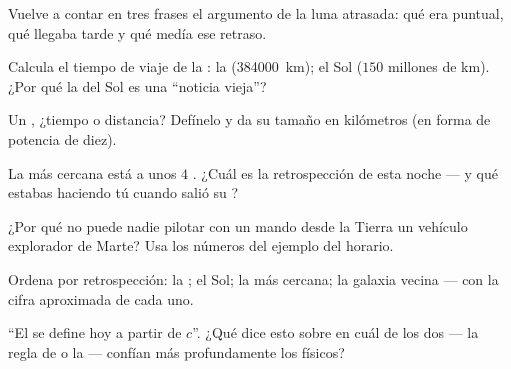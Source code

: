 \begin{exercise}[$\star$]\label{exo:g8:speed-of-light:2}
Vuelve a contar en tres frases el argumento de la luna atrasada: qué
era puntual, qué llegaba tarde y qué medía ese retraso.
\end{exercise}

\begin{exercise}[$\star$]\label{exo:g8:speed-of-light:3}
Calcula el tiempo de viaje de la : la 
(\qty{384000}{km}); el Sol ($150$ millones de km). ¿Por qué la  del
Sol es una ``noticia vieja''?
\end{exercise}

\begin{exercise}[$\star$]\label{exo:g8:speed-of-light:4}
Un , ¿tiempo o distancia? Defínelo y da su tamaño en
kilómetros (en forma de potencia de diez).
\end{exercise}

\begin{exercise}[$\star$]\label{exo:g8:speed-of-light:5}
La  más cercana está a unos $4$ . ¿Cuál
es la retrospección de esta noche --- y qué estabas haciendo tú cuando
salió su ?
\end{exercise}

\begin{exercise}[$\star$]\label{exo:g8:speed-of-light:6}
¿Por qué no puede nadie pilotar con un mando desde la Tierra un
vehículo explorador de Marte? Usa los números del ejemplo del horario.
\end{exercise}

\begin{exercise}[$\star$]\label{exo:g8:speed-of-light:7}
Ordena por retrospección: la ; el Sol; la
 más cercana; la galaxia vecina --- con la cifra
aproximada de cada uno.
\end{exercise}

\begin{exercise}[$\star$]\label{exo:g8:speed-of-light:8}
``El  se define hoy a partir de $c$''. ¿Qué dice esto sobre
en cuál de los dos --- la regla de  o la  --- confían más
profundamente los físicos?
\end{exercise}

